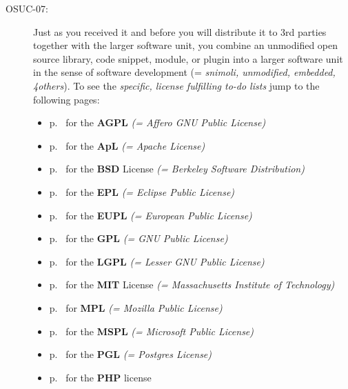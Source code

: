 \begin{description}
\item[OSUC-07:]\label{OSUC-07-DEF} Just as you received it and before you will
distribute it to 3rd parties together with the larger software unit, you
combine an unmodified open source library, code snippet, module, or plugin into
a larger software unit in the sense of software development (= \textit{snimoli,
unmodified, embedded, 4others}). 
To see the \textit{specific, license fulfilling to-do lists} jump to the
following pages:
   \begin{itemize}
    \item p.\ \pageref{OSUC-07-AGPL} for the \textbf{AGPL}
      \textit{(= Affero GNU Public License)} 
    \item p.\ \pageref{OSUC-07-Apache20} for the \textbf{ApL}
      \textit{(= Apache License)}
    \item p.\ \pageref{OSUC-07-BSD} for the \textbf{BSD} License
      \textit{(= Berkeley Software Distribution)}
    \item p.\ \pageref{OSUC-07-EPL} for the \textbf{EPL}
      \textit{(= Eclipse Public License)}     
    \item p.\ \pageref{OSUC-07-EUPL} for the \textbf{EUPL}
      \textit{(= European Public License)} 
    \item p.\ \pageref{OSUC-07-GPL} for the \textbf{GPL}
       \textit{(= GNU Public License)} 
    \item p.\ \pageref{OSUC-07-LGPL} for the \textbf{LGPL}
      \textit{(= Lesser GNU Public License)}           
    \item p.\ \pageref{OSUC-07-MIT} for the \textbf{MIT} License
       \textit{(= Massachusetts Institute of Technology)} 
    \item p.\ \pageref{OSUC-07-MPL} for \textbf{MPL}
      \textit{(= Mozilla Public License)}     
    \item p.\ \pageref{OSUC-07-MsPL} for the \textbf{MSPL}
      \textit{(= Microsoft Public License)} 
    \item p.\ \pageref{OSUC-07-PGL} for the \textbf{PGL}
      \textit{(= Postgres License)} 
    \item p.\ \pageref{OSUC-07-PHP} for the \textbf{PHP} license 
  \end{itemize}


\end{description}
